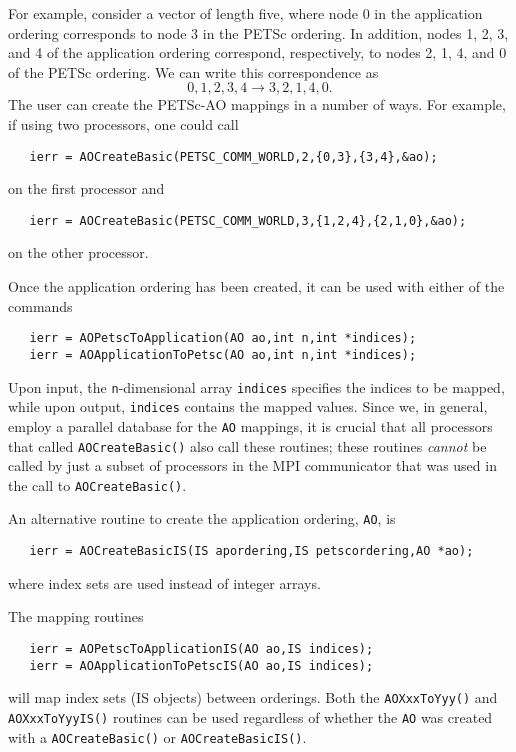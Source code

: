 For example, consider a vector of length five, where node 0 in the application ordering
corresponds to node 3 in the PETSc ordering.  In addition, nodes 1, 2, 3, and 4 of
the application ordering correspond, respectively, to nodes 2, 1, 4, and 0 of
the PETSc ordering.
We can write this correspondence as
\[
 { 0, 1, 2, 3, 4 }  \rightarrow  { 3, 2, 1, 4, 0 }. 
\]
The user can create the PETSc-AO mappings in a number of ways.  For example,
if using two processors, one could call
\begin{verbatim}
   ierr = AOCreateBasic(PETSC_COMM_WORLD,2,{0,3},{3,4},&ao);
\end{verbatim}
on the first processor and 
\begin{verbatim}
   ierr = AOCreateBasic(PETSC_COMM_WORLD,3,{1,2,4},{2,1,0},&ao);
\end{verbatim}
on the other processor.

Once the application ordering has been created, it can be used
with either of the commands
\begin{verbatim}
   ierr = AOPetscToApplication(AO ao,int n,int *indices);
   ierr = AOApplicationToPetsc(AO ao,int n,int *indices);
\end{verbatim}
Upon input, the {\tt n}-dimensional array {\tt indices} specifies 
the indices to be mapped, while upon output, {\tt indices} contains
the mapped values.
 
Since we, in general, employ a parallel database for the
{\tt AO} mappings, it is crucial that all processors that
called {\tt AOCreateBasic()} also call these routines; these
routines {\em cannot} be called by just a subset of processors
in the MPI communicator that was used in the call to {\tt AOCreateBasic()}.

An alternative routine to create the application ordering, {\tt AO}, is 
\begin{verbatim}
   ierr = AOCreateBasicIS(IS apordering,IS petscordering,AO *ao);
\end{verbatim}
where index sets are used instead of integer arrays. 

The 
mapping routines 
\begin{verbatim}
   ierr = AOPetscToApplicationIS(AO ao,IS indices);
   ierr = AOApplicationToPetscIS(AO ao,IS indices);
\end{verbatim}
 
will map index sets (IS objects) between orderings. Both the {\tt AOXxxToYyy()} and 
{\tt AOXxxToYyyIS()} routines can be used regardless of whether the {\tt AO} was 
created with a {\tt AOCreateBasic()} or {\tt AOCreateBasicIS()}.

